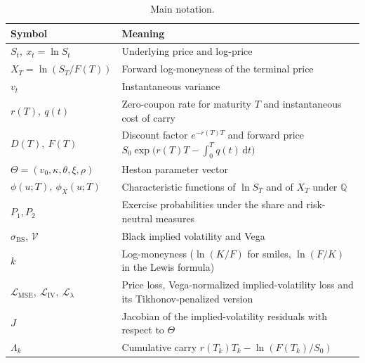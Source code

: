 \documentclass[11pt,a4paper]{article}
\theoremstyle{plain}
\theoremstyle{definition}
\newcommand{\dd}{\mathrm{d}}
\newcommand{\Q}{\mathbb{Q}}
\begin{document}
\begin{table}[h]
\centering
\begin{tabular}{@{}lp{11.5cm}@{}}
\toprule
Symbol & Meaning \\
\midrule
$S_t,\ x_t=\ln S_t$ & Underlying price and log-price \\
$X_T=\ln(S_T/F(T))$ & Forward log-moneyness of the terminal price \\
$v_t$ & Instantaneous variance \\
$r(T),\ q(t)$ & Zero-coupon rate for maturity $T$ and instantaneous cost of carry \\
$D(T),\ F(T)$ & Discount factor $e^{-r(T)T}$ and forward price $S_0\exp\bigl(r(T)T-\int_0^Tq(t)\,\dd t\bigr)$ \\
$\Theta=(v_0,\kappa,\theta,\xi,\rho)$ & Heston parameter vector \\
$\phi(u;T),\ \phi_X(u;T)$ & Characteristic functions of $\ln S_T$ and of $X_T$ under $\Q$ \\
$P_1,P_2$ & Exercise probabilities under the share and risk-neutral measures \\
$\sigma_{\mathrm{BS}}$, $\mathcal V$ & Black implied volatility and Vega \\
$k$ & Log-moneyness ($\ln(K/F)$ for smiles, $\ln(F/K)$ in the Lewis formula) \\
$\mathcal L_{\mathrm{MSE}},\ \mathcal L_{\mathrm{IV}},\ \mathcal L_\lambda$ & Price loss, Vega-normalized implied-volatility loss and its Tikhonov-penalized version \\
$J$ & Jacobian of the implied-volatility residuals with respect to $\Theta$ \\
$\Lambda_k$ & Cumulative carry $r(T_k)T_k-\ln(F(T_k)/S_0)$ \\
\bottomrule
\end{tabular}
\caption{Main notation.}
\label{tab:notation}
\end{table}

\clearpage
\end{document}

